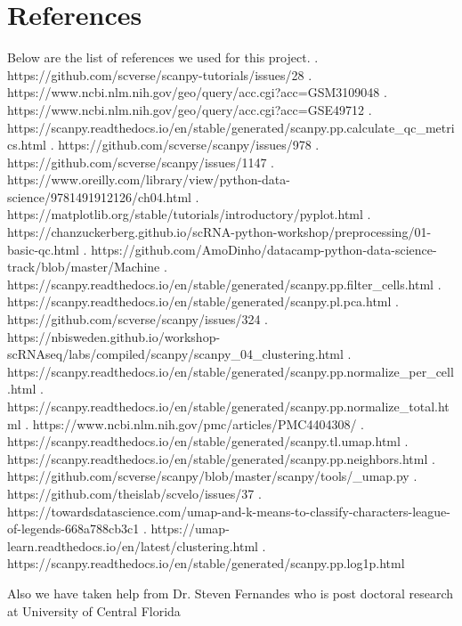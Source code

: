 \documentclass{article}
\begin{document}
\section*{References}
Below are the list of references we used for this project.
. https://github.com/scverse/scanpy-tutorials/issues/28
. https://www.ncbi.nlm.nih.gov/geo/query/acc.cgi?acc=GSM3109048
. https://www.ncbi.nlm.nih.gov/geo/query/acc.cgi?acc=GSE49712
. https://scanpy.readthedocs.io/en/stable/generated/scanpy.pp.calculate_qc_metrics.html
. https://github.com/scverse/scanpy/issues/978
. https://github.com/scverse/scanpy/issues/1147
. https://www.oreilly.com/library/view/python-data-science/9781491912126/ch04.html
. https://matplotlib.org/stable/tutorials/introductory/pyplot.html
. https://chanzuckerberg.github.io/scRNA-python-workshop/preprocessing/01-basic-qc.html
. https://github.com/AmoDinho/datacamp-python-data-science-track/blob/master/Machine%
. https://scanpy.readthedocs.io/en/stable/generated/scanpy.pp.filter_cells.html
. https://scanpy.readthedocs.io/en/stable/generated/scanpy.pl.pca.html
. https://github.com/scverse/scanpy/issues/324
. https://nbisweden.github.io/workshop-scRNAseq/labs/compiled/scanpy/scanpy_04_clustering.html
. https://scanpy.readthedocs.io/en/stable/generated/scanpy.pp.normalize_per_cell.html
. https://scanpy.readthedocs.io/en/stable/generated/scanpy.pp.normalize_total.html
. https://www.ncbi.nlm.nih.gov/pmc/articles/PMC4404308/
. https://scanpy.readthedocs.io/en/stable/generated/scanpy.tl.umap.html
. https://scanpy.readthedocs.io/en/stable/generated/scanpy.pp.neighbors.html
. https://github.com/scverse/scanpy/blob/master/scanpy/tools/_umap.py
. https://github.com/theislab/scvelo/issues/37
. https://towardsdatascience.com/umap-and-k-means-to-classify-characters-league-of-legends-668a788cb3c1
. https://umap-learn.readthedocs.io/en/latest/clustering.html
. https://scanpy.readthedocs.io/en/stable/generated/scanpy.pp.log1p.html

\newline
Also we have taken help from Dr. Steven Fernandes who is post doctoral research at University of Central Florida
\end{document}
